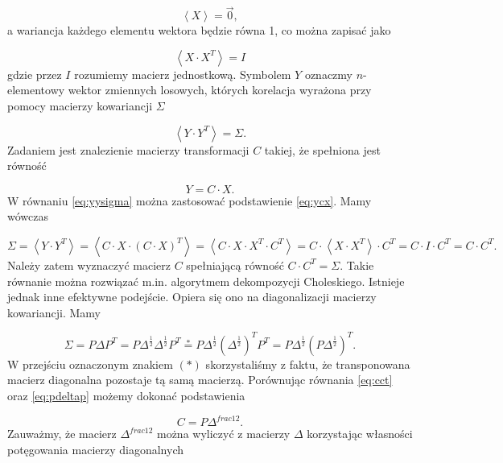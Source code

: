 \documentclass[11pt,titlepage]{article}
\numberwithin{equation}{section}
\begin{document}
\begin{equation}
\left \langle X \right \rangle = \vec{0},
\end{equation} 
a wariancja każdego elementu wektora będzie równa 1, co można zapisać jako


\begin{equation}
\left \langle X \cdot X^T \right \rangle = I
\end{equation} 
gdzie przez $I$ rozumiemy macierz jednostkową. Symbolem $Y$ oznaczmy $n$-elementowy wektor zmiennych losowych, których korelacja wyrażona przy pomocy macierzy kowariancji $\Sigma$


\begin{equation}\label{eq:yysigma}
\left \langle Y \cdot Y^T \right \rangle = \Sigma.
\end{equation} 
Zadaniem jest znalezienie macierzy transformacji $C$ takiej, że spełniona jest równość

\begin{equation}\label{eq:ycx}
Y=C \cdot X.
\end{equation} 
W równaniu \eqref{eq:yysigma} można zastosować podstawienie \eqref{eq:ycx}. Mamy wówczas

\begin{equation}\label{eq:cct}
\Sigma = \left \langle Y \cdot Y^T \right \rangle = \left \langle C \cdot X \cdot (C \cdot X)^T \right \rangle =
\left \langle C \cdot X \cdot X^T \cdot C^T \right \rangle =  C \cdot \left \langle X \cdot X^T \right \rangle \cdot C^T =
C \cdot I \cdot C^T = C \cdot C^T.
\end{equation} 
Należy zatem wyznaczyć macierz $C$ spełniającą równość $C \cdot C^T = \Sigma$. Takie równanie można rozwiązać m.in. algorytmem dekompozycji Choleskiego. Istnieje jednak inne efektywne podejście. Opiera się ono na diagonalizacji macierzy kowariancji. Mamy 

\begin{equation}\label{eq:pdeltap}
\Sigma=P\Delta P^T=P \Delta^{\frac{1}{2}} \Delta^{\frac{1}{2}} P^T \stackrel{*}{=}
P   \Delta^{\frac{1}{2}}  (\Delta^{\frac{1}{2}})^T   P^T =
P   \Delta^{\frac{1}{2}}  ( P   \Delta^{\frac{1}{2}} )^T.
\end{equation} 
W przejściu oznaczonym znakiem $(*)$ skorzystaliśmy z faktu, że transponowana macierz diagonalna pozostaje tą samą macierzą. Porównując równania \eqref{eq:cct} oraz \eqref{eq:pdeltap} możemy dokonać podstawienia


\begin{equation}\label{eq:cpdeltafrac}
C  =P  \Delta^{frac{1}{2}}.
\end{equation} 
Zauważmy, że macierz $\Delta^{frac{1}{2}}$ można wyliczyć z macierzy $\Delta$ korzystając własności potęgowania macierzy diagonalnych
\end{document}
